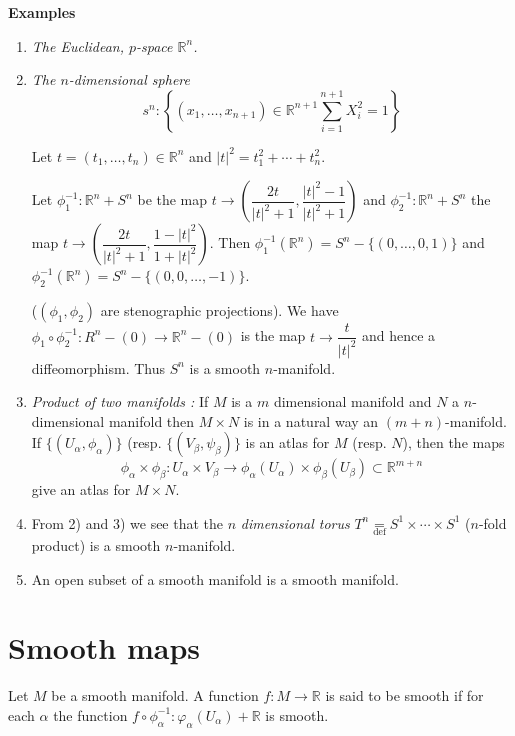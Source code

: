 \medskip
\noindent
{\bf Examples}
\begin{enumerate}
\item {\em The Euclidean, $p$-space $\mathbb{R}^{n}$.}

\item {\em The $n$-dimensional sphere}
$$
s^{n}:\left\{(x_{1},\ldots,x_{n+1})\in \mathbb{R}^{n+1}\sum\limits^{n+1}_{i=1}X^{2}_{i}=1\right\}
$$

Let $t=(t_{1},\ldots,t_{n})\in \mathbb{R}^{n}$ and $|t|^{2}=t^{2}_{1}+\cdots+t^{2}_{n}$.

Let $\phi^{-1}_{1}:\mathbb{R}^{n}+S^{n}$ be the map $t\to \left(\dfrac{2t}{|t|^{2}+1},\dfrac{|t|^{2}-1}{|t|^{2}+1}\right)$ and $\phi^{-1}_{2}:\mathbb{R}^{n}+S^{n}$ the map $t\to \left(\dfrac{2t}{|t|^{2}+1},\dfrac{1-|t|^{2}}{1+|t|^{2}}\right)$. Then $\phi^{-1}_{1}(\mathbb{R}^{n})=S^{n}-\{(0,\ldots,0,1)\}$ and $\phi^{-1}_{2}(\mathbb{R}^{n})=S^{n}-\{(0,0,\ldots,-1)\}$.

($(\phi_{1},\phi_{2})$ are stenographic projections). We have $\phi_{1}\circ \phi^{-1}_{2}:R^{n}-(0)\to \mathbb{R}^{n}-(0)$ is the map $t\to \dfrac{t}{|t|^{2}}$ and hence a diffeomorphism. Thus $S^{n}$ is a smooth $n$-manifold.

\item {\em Product of two manifolds :} If $M$ is a $m$ dimensional manifold and $N$ a $n$-dimensional manifold then $M\times N$ is in a natural way an $(m+n)$-manifold. If $\{(U_{\alpha},\phi_{\alpha})\}$ (resp. $\{(V_{\beta},\psi_{\beta})\}$ is an atlas for $M$ (resp. $N$), then the maps
$$
\phi_{\alpha}\times \phi_{\beta}:U_{\alpha}\times V_{\beta}\to \phi_{\alpha}(U_{\alpha})\times \phi_{\beta}(U_{\beta})\subset \mathbb{R}^{m+n}
$$\pageoriginale
give an atlas for $M\times N$.

\item From 2) and 3) we see that the $n$ {\em dimensional torus} $T^{n}{\displaystyle{\mathop{=}\limits_{\text{def}}}}S^{1}\times \cdots \times S^{1}$ ($n$-fold product) is a smooth $n$-manifold.

\item An open subset of a smooth manifold is a smooth manifold.
\end{enumerate}

\section*{Smooth maps}

Let $M$ be a smooth manifold. A function $f:M\to \mathbb{R}$ is said to be smooth if for each $\alpha$ the function $f\circ \phi^{-1}_{\alpha}:\varphi_{\alpha}(U_{\alpha})+\mathbb{R}$ is smooth.

